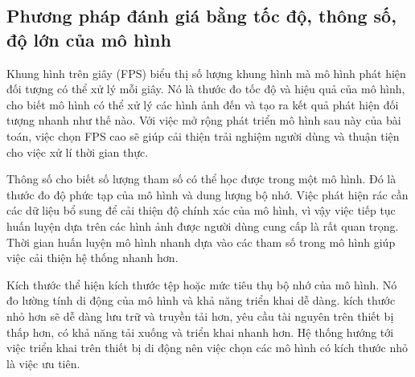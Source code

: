 \documentclass[../the.tex]{subfiles}
\begin{document}
\subsection{Phương pháp đánh giá bằng tốc độ, thông số, độ lớn của mô hình}

{\fontsize{13}{12} \selectfont
	Khung hình trên giây (FPS) biểu thị số lượng khung hình mà mô hình phát hiện đối tượng có thể xử lý mỗi giây. Nó là thước đo tốc độ và hiệu quả của mô hình, cho biết mô hình có thể xử lý các hình ảnh đến và tạo ra kết quả phát hiện đối tượng nhanh như thế nào.
	Với việc mở rộng phát triển mô hình sau này của bài toán, việc chọn FPS cao sẽ giúp cải thiện trải nghiệm người dùng và thuận tiện cho việc xử lí thời gian thực.

	Thông số cho biết số lượng tham số có thể học được trong một mô hình. Đó là thước đo độ phức tạp của mô hình và dung lượng bộ nhớ. Việc phát hiện rác cần các dữ liệu bổ sung để cải thiện độ chính xác của mô hình, vì vậy việc tiếp tục huấn luyện dựa trên các hình ảnh được người dùng cung cấp là rất quan trọng.
	Thời gian huấn luyện mô hình nhanh dựa vào các tham số trong mô hình giúp việc cải thiện hệ thống nhanh hơn.

	Kích thước thể hiện kích thước tệp hoặc mức tiêu thụ bộ nhớ của mô hình. Nó đo lường tính di động của mô hình và khả năng triển khai dễ dàng.
	kích thước nhỏ hơn sẽ dễ dàng lưu trữ và truyền tải hơn, yêu cầu tài nguyên trên thiết bị thấp hơn, có khả năng tải xuống và triển khai nhanh hơn. Hệ thống hướng tới việc triển khai trên thiết bị di động nên việc chọn các mô hình có kích thước nhỏ là việc ưu tiên.
}
\end{document}
